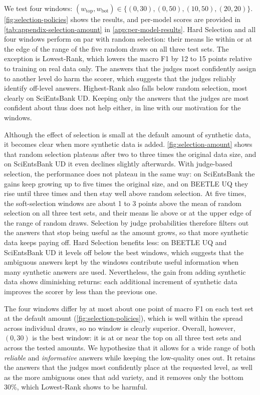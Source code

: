 We test four windows: $(w_{\mathrm{top}}, w_{\mathrm{bot}}) \in \{(0, 30), (0, 50), (10, 50), (20, 20)\}$. \autoref{fig:selection-policies} shows the results, and per-model scores are provided in \autoref{tab:appendix-selection-amount} in \autoref{app:per-model-results}. Hard Selection and all four windows perform on par with random selection: their means lie within or at the edge of the range of the five random draws on all three test sets. The exception is Lowest-Rank, which lowers the macro F1 by 12 to 15 points relative to training on real data only. The answers that the judges most confidently assign to another level do harm the scorer, which suggests that the judges reliably identify off-level answers. Highest-Rank also falls below random selection, most clearly on SciEntsBank UD. Keeping only the answers that the judges are most confident about thus does not help either, in line with our motivation for the windows.

Although the effect of selection is small at the default amount of synthetic data, it becomes clear when more synthetic data is added. \autoref{fig:selection-amount} shows that random selection plateaus after two to three times the original data size, and on SciEntsBank UD it even declines slightly afterwards. With judge-based selection, the performance does not plateau in the same way: on SciEntsBank the gains keep growing up to five times the original size, and on BEETLE UQ they rise until three times and then stay well above random selection. At five times, the soft-selection windows are about 1 to 3 points above the mean of random selection on all three test sets, and their means lie above or at the upper edge of the range of random draws. Selection by judge probabilities therefore filters out the answers that stop being useful as the amount grows, so that more synthetic data keeps paying off. Hard Selection benefits less: on BEETLE UQ and SciEntsBank UD it levels off below the best windows, which suggests that the ambiguous answers kept by the windows contribute useful information when many synthetic answers are used. Nevertheless, the gain from adding synthetic data shows diminishing returns: each additional increment of synthetic data improves the scorer by less than the previous one.  


The four windows differ by at most about one point of macro F1 on each test set at the default amount (\autoref{fig:selection-policies}), which is well within the spread across individual draws, so no window is clearly superior. Overall, however, $(0, 30)$ is the best window: it is at or near the top on all three test sets and across the tested amounts. We hypothesize that it allows for a wide range of both \emph{reliable} and \emph{informative} answers while keeping the low-quality ones out. It retains the answers that the judges most confidently place at the requested level, as well as the more ambiguous ones that add variety, and it removes only the bottom 30\%, which Lowest-Rank shows to be harmful.


